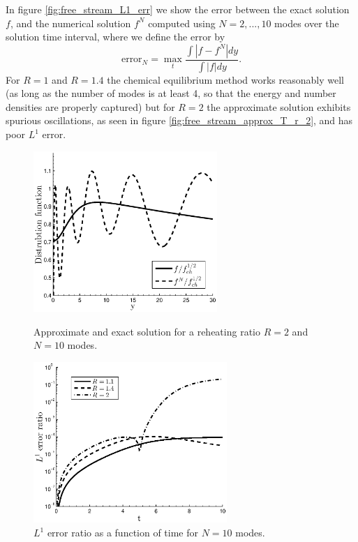In figure  \ref{fig:free_stream_L1_err} we show the error between the exact solution $f$, and the numerical solution $f^N$ computed using $N=2,...,10$ modes over the solution time interval, where we define the error by
\begin{equation}\label{f_err}
\text{error}_N=\max_{t} \frac{\int |f-f^N|dy}{\int |f|dy}.
\end{equation}
For $R=1$ and $R=1.4$  the chemical equilibrium method works reasonably well (as long as the number of modes is at least 4, so that the energy and number densities are properly captured) but for $R=2$ the approximate solution exhibits spurious oscillations, as seen in figure \ref{fig:free_stream_approx_T_r_2}, and has poor $L^1$ error.  


\begin{figure}[H]
\begin{minipage}[t]{0.5\linewidth}
\centerline{\includegraphics[height=6.1cm]{03-birrell/SpectralMethodBoltzmann/free_stream_approx_T_r_2.eps}}
\caption{Approximate and exact solution for a reheating ratio $R=2$ and $N=10$ modes.}\label{fig:free_stream_approx_T_r_2}
 \end{minipage}
 \hspace{0.5cm}
 \begin{minipage}[t]{0.5\linewidth}
\centerline{\includegraphics[height=6.1cm]{03-birrell/SpectralMethodBoltzmann/free_stream_L1_err_time.eps}}
\caption{$L^1$ error ratio as a function of time for $N=10$ modes.}\label{fig:free_stream_L1_err_time}
 \end{minipage}
 \end{figure}

